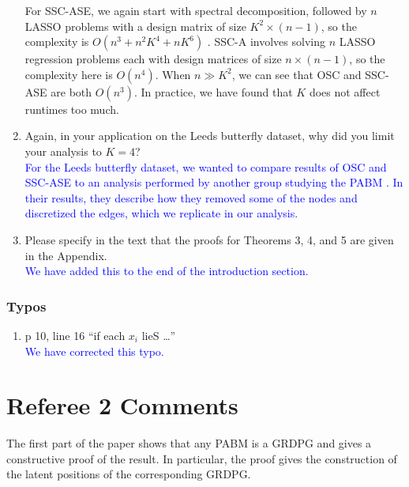 \documentclass[
]{article}
\providecommand{\tightlist}{%
  \setlength{\itemsep}{0pt}\setlength{\parskip}{0pt}}
\begin{document}
\begin{enumerate}
{  For SSC-ASE, we again start with spectral decomposition, followed by $n$ LASSO problems with a design matrix of size $K^2 \times (n - 1)$, so the complexity is $O(n^3 + n^2 K^4 + n K^6)$ \cite{10.1214/009053604000000067}. 
  SSC-A involves solving $n$ LASSO regression problems each with design matrices of size $n \times (n - 1)$, so the complexity here is $O(n^4)$. 
  When $n \gg K^2$, we can see that OSC and SSC-ASE are both $O(n^3)$. 
  In practice, we have found that $K$ does not affect runtimes too much. 
  }
\item
  Again, in your application on the Leeds butterfly dataset, why did you
  limit your analysis to \(K = 4\)?\\
  \textcolor{blue}{
  For the Leeds butterfly dataset, we wanted to compare results of OSC and SSC-ASE to an analysis performed by another group studying the PABM \citep{noroozi2019estimation}. 
  In their results, they describe how they removed some of the nodes and discretized the edges, which we replicate in our analysis. 
  }
\item
  Please specify in the text that the proofs for Theorems 3, 4, and 5
  are given in the Appendix.\\
  \textcolor{blue}{
  We have added this to the end of the introduction section.
  }
\end{enumerate}

\hypertarget{typos}{%
\subsubsection{Typos}\label{typos}}

\begin{enumerate}
\def\labelenumi{\arabic{enumi}.}
\tightlist
\item
  p 10, line 16 ``if each \(x_i\) lieS \ldots{}''\\
  \textcolor{blue}{
  We have corrected this typo. 
  }
\end{enumerate}

\hypertarget{referee-2-comments}{%
\section{Referee 2 Comments}\label{referee-2-comments}}

The first part of the paper shows that any PABM is a GRDPG and gives a
constructive proof of the result. In particular, the proof gives the
construction of the latent positions of the corresponding GRDPG.
\end{document}
